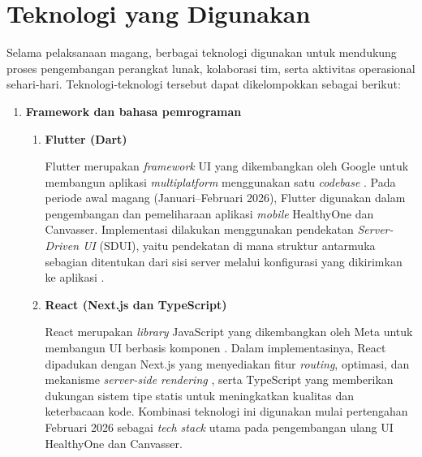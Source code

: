\section{Teknologi yang Digunakan}

Selama pelaksanaan magang, berbagai teknologi digunakan untuk mendukung proses
pengembangan perangkat lunak, kolaborasi tim, serta aktivitas operasional
sehari-hari. Teknologi-teknologi tersebut dapat dikelompokkan sebagai berikut:

\begin{enumerate}
      \item \textbf{Framework dan bahasa pemrograman}

            \begin{enumerate}[noitemsep, topsep=0pt]
                  \item \textbf{Flutter (Dart)}

                        Flutter merupakan \textit{framework} UI yang dikembangkan oleh Google untuk
                        membangun aplikasi \textit{multiplatform} menggunakan satu \textit{codebase}
                        \cite{flutter_docs}. Pada periode awal magang (Januari--Februari 2026), Flutter
                        digunakan dalam pengembangan dan pemeliharaan aplikasi \textit{mobile}
                        HealthyOne dan Canvasser. Implementasi dilakukan menggunakan pendekatan
                        \textit{Server-Driven UI} (SDUI), yaitu pendekatan di mana struktur antarmuka
                        sebagian ditentukan dari sisi server melalui konfigurasi yang dikirimkan ke
                        aplikasi \cite{airbnb_sd_ui}.

                  \item \textbf{React (Next.js dan TypeScript)}

                        React merupakan \textit{library} JavaScript yang dikembangkan oleh Meta untuk
                        membangun UI berbasis komponen \cite{react_docs}. Dalam implementasinya, React
                        dipadukan dengan Next.js yang menyediakan fitur \textit{routing}, optimasi, dan
                        mekanisme \textit{server-side rendering} \cite{nextjs_docs}, serta TypeScript
                        yang memberikan dukungan sistem tipe statis untuk meningkatkan kualitas dan
                        keterbacaan kode. Kombinasi teknologi ini digunakan mulai pertengahan Februari
                        2026 sebagai \textit{tech stack} utama pada pengembangan ulang UI HealthyOne
                        dan Canvasser.


\end{enumerate}
\end{enumerate}
